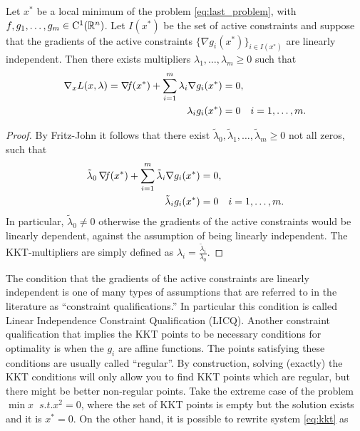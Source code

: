 \documentclass[10pt,a4paper]{article}
\begin{document}
\begin{theorem}
	Let $x^*$ be a local minimum of the problem \eqref{eq:last_problem}, with $f, g_1,\dots, g_m\in \mathord{\mathrm{C^1}}(\mathbb{R}^n)$. Let $I(x^*)$ be the set of active constraints and suppose that the gradients of the active constraints $\{\nabla g_i(x^*)\}_{i\in I(x^*)}$ are linearly independent. Then there exists multipliers $\lambda_1, \dots, \lambda_m\geq 0$ such that 
	\begin{equation}\label{eq:kkt}
		\begin{split}
			\nabla_x L(x,\lambda) = \operatorname*{\mathit{\nabla \!f}}(x^*)+ \sum_{i=1}^{m} \lambda_i \nabla g_i(x^*) &= 0,\\
			\lambda_ig_i(x^*)&=0 \quad i=1, \dots, m.
		\end{split}
	\end{equation}
\end{theorem}
\begin{proof}
	By Fritz-John it follows that there exist $\tilde{\lambda}_0, \tilde{\lambda}_1, \dots, \tilde{\lambda}_m\geq 0$ not all zeros, such that \begin{equation*}
		\begin{split}
			\tilde{\lambda}_0\operatorname*{\mathit{\nabla \!f}}(x^*)+ \sum_{i=1}^{m} \tilde{\lambda}_i \nabla g_i(x^*) &= 0,\\
			\tilde{\lambda}_ig_i(x^*)&=0 \quad i=1, \dots, m.
		\end{split}
	\end{equation*}
In particular, $\tilde{\lambda}_0\neq0$ otherwise the gradients of the active constraints would be linearly dependent, against the assumption of being linearly independent. The KKT-multipliers are simply defined as $\lambda_i=\frac{\tilde{\lambda}_i}{\lambda_0}$.
\end{proof}
\noindent The condition that the gradients of the active constraints are linearly independent
is one of many types of assumptions that are referred to in the literature as ``constraint
qualifications.'' In particular this condition is called Linear Independence Constraint Qualification (LICQ). Another constraint qualification that implies the KKT points to be necessary conditions for optimality is when the $g_i$ are affine functions. The points satisfying these conditions are usually called ``regular''. By construction, solving (exactly) the KKT conditions will only allow you to find KKT points which are regular, but there might be better non-regular points. Take the extreme case of the problem $\min x\; \; s.t. x^2=0$, where the set of KKT points is empty but the solution exists and it is $x^*=0$. On the other hand, it is possible to rewrite system \eqref{eq:kkt} as 
\end{document}
